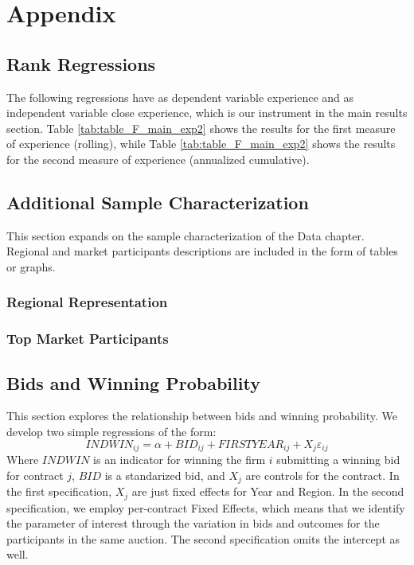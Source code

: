 \chapter{Appendix}
\section{Rank Regressions}

The following regressions have as dependent variable experience and as independent variable close experience, which is our instrument in the main results section. Table \ref{tab:table_F_main_exp2} shows the results for the first measure of experience (rolling), while Table \ref{tab:table_F_main_exp2} shows the results for the second measure of experience (annualized cumulative).



\clearpage
\section{Additional Sample Characterization}
This section expands on the sample characterization of the Data chapter. Regional and market participants descriptions are included in the form of tables or graphs.

\subsection{Regional Representation}

\clearpage

\subsection{Top Market Participants}

\small

\clearpage


\section{Bids and Winning Probability}
This section explores the relationship between bids and winning probability. We develop two simple regressions of the form:
\begin{equation}
  \label{eqn:helpbids}
INDWIN_{ij}  = \alpha +BID_{ij}+  FIRSTYEAR_{ij}+X_j\varepsilon_{ij}
\end{equation}
Where $INDWIN$ is an indicator for winning the firm $i$ submitting a winning bid for contract $j$, $BID$ is a standarized bid, and $X_j$ are controls for the contract. In the first specification, $X_j$ are just fixed effects for Year and Region. In the second specification, we employ per-contract Fixed Effects, which means that we identify the parameter of interest through the variation in bids and outcomes for the participants in the same auction. The second specification omits the intercept as well.


